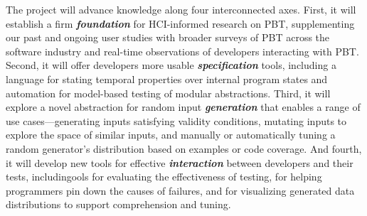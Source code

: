 The project will advance knowledge along four interconnected axes.
%
First, it will establish a firm {\bf\em foundation} for HCI-informed
research on PBT, supplementing our past and ongoing user studies with
broader surveys of PBT across the software industry and real-time
observations of developers interacting with PBT.
%
Second, it will offer developers more usable {\bf\em specification} tools,
including a language for stating temporal properties over internal
program states and automation for model-based testing of
modular abstractions.
%
Third, it will explore a novel abstraction for random input {\bf\em
  generation} that enables a range of use cases---generating inputs
satisfying validity conditions, mutating inputs to explore the space
of similar inputs, and manually or automatically tuning a random
generator's distribution based on examples or code coverage.
%
And fourth, it will develop new tools for effective {\bf\em
  interaction} between developers and their tests, includingools for
evaluating the effectiveness of testing, for helping programmers pin
down the causes of failures, and for visualizing generated data
distributions to support comprehension and tuning.



